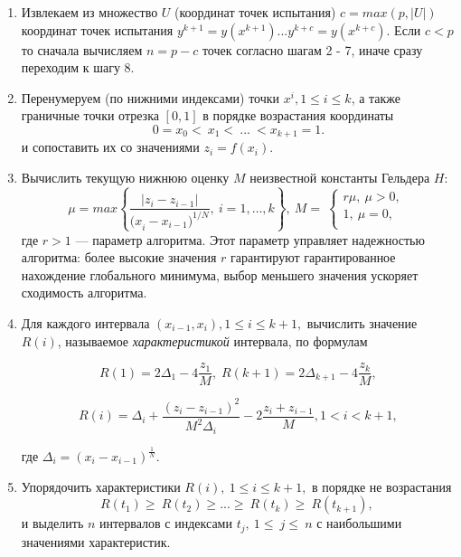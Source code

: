 \documentclass[runningheads]{llncs}
\begin{document}
\begin{enumerate}
	
	\item Извлекаем из множество $U$ (координат точек испытания) $c = max(p, |U|)$ координат точек испытания $y^{k+1}=y\left(x^{k+1}\right) ... y^{k+c}=y\left(x^{k+c}\right)$. Если $c < p$ то сначала вычисляем $n = p - c$ точек согласно шагам 2 - 7, иначе сразу переходим к шагу 8.	
	
	\item Перенумеруем (по нижними индексами) точки $x^i, 1\leq i\leq k$, а также граничные точки отрезка $[0,1]$ в порядке возрастания координаты  
	\begin{equation} 
		\label{agp1_sort} 	0=x_0<\ x_1<\ ...\ <x_{k+1}=1. 	
	\end{equation} 
	и сопоставить их со значениями $z_i=f(x_i)$. 
	
	\item  Вычислить текущую нижнюю оценку $M$ неизвестной константы Гельдера $H$: 
	\begin{equation} 
		\label{agp2_mu} 	\mu=max\left\{\frac{|z_i-z_{i-1}|}{{{(x}_i-x_{i-1})}^{1/N}},\ i=1,\ldots,k\right\},\ M=\  \left\{\begin{matrix}r\mu,\ \mu>0,\\1,\ \mu=0,\\\end{matrix}\right.\ 	
	\end{equation} 
	где $r>1$ — параметр алгоритма. Этот параметр управляет надежностью алгоритма: более высокие значения $r$ гарантируют гарантированное нахождение глобального минимума, выбор меньшего значения ускоряет сходимость алгоритма.
	
	\item  Для каждого интервала $(x_{i-1},x_i), 1\leq i\leq k+1,$ вычислить значение $R(i)$, называемое \textit{характеристикой} интервала, по формулам
	
	\begin{equation} 
		\label{agp3_R1} R(1)=2\Delta_1-4\dfrac{z_1}{M}, \; R(k+1)=2\Delta_{k+1}-4\dfrac{z_k}{M}, 
	\end{equation} 
	
	\begin{equation} 
		\label{agp3_Ri} R(i)=\Delta_i+\dfrac{(z_i-z_{i-1})^2}{M^2\Delta_i}-2\dfrac{z_i+z_{i-1}}{M},1<i<k+1, 
	\end{equation} 
	
	где \(\Delta_i=(x_i-x_{i-1})^\frac{1}{N}\).
	
	\item   Упорядочить характеристики $R\left(i\right),\ 1\leq i \leq k+1,$ в порядке не возрастания
	\begin{equation} 
		\label{agp4_R_sort} 	R\left(t_1\right)\geq\ R\left(t_2\right)\geq...\geq\ R\left(t_k\right)\geq\ R(t_{k+1}),\  
	\end{equation} 
	и выделить $n$ интервалов с индексами $t_j,\ 1\le\ j\le\ n$  с наибольшими значениями характеристик.	
	

\end{enumerate}
\end{document}
